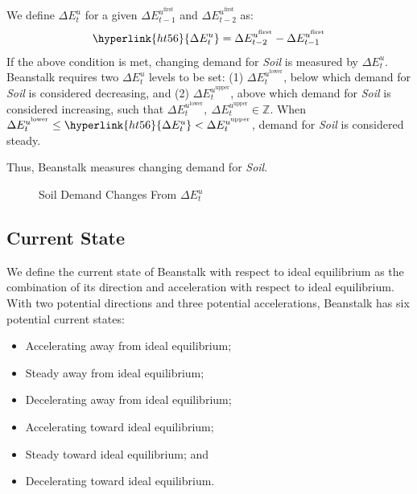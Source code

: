\documentclass[tikz]{article}
\newcommand{\term}[1]{\textsl{#1}}
\begin{document}
We define \hyperlink{ht56}{$\Delta E_{t}^{u}$} for a given $\Delta E_{t-1}^{u^{\text{first}}}$ and $\Delta E_{t-2}^{u^{\text{first}}}$ as:
$$\hyperlink{ht56}{\Delta E_{t}^{u}} = \Delta E_{t-2}^{u^{\text{first}}} - \Delta E_{t-1}^{u^{\text{first}}}$$
If the above condition is met, changing demand for \term{Soil} is measured by \hyperlink{ht56}{$\Delta E_{t}^{u}$}. Beanstalk requires two \hyperlink{ht56}{$\Delta E_{t}^{u}$} levels to be set: (1) $\Delta E_{t}^{u^{\text{lower}}}$, below which demand for \term{Soil} is considered decreasing, and (2) $\Delta E_{t}^{u^{\text{upper}}}$, above which demand for \term{Soil} is considered increasing, such that $\Delta E_{t}^{u^{\text{lower}}},\ \Delta E_{t}^{u^{\text{upper}}} \in \mathbb{Z}$. When $\Delta E_{t}^{u^{\text{lower}}} \leq \hyperlink{ht56}{\Delta E_{t}^{u}} < \Delta E_{t}^{u^{\text{upper}}}$, demand for \term{Soil} is considered steady.

Thus, Beanstalk measures changing demand for \term{Soil}.

\begin{figure}[h!]
    \centering
    
    \vspace*{-10.5mm} %
    \setlength{\belowcaptionskip}{-8pt} %
    \caption{Soil Demand Changes From $\Delta E_{t}^{u}$}
    \label{Fig 9}
\end{figure}

\subsection{Current State}

We define the current state of Beanstalk with respect to ideal equilibrium as the combination of its direction and acceleration with respect to ideal equilibrium. With two potential directions and three potential accelerations, Beanstalk has six potential current states:
\begin{multicols}{2}
\begin{itemize}[midsep]
    \item Accelerating away from ideal equilibrium;
    \item Steady away from ideal equilibrium;
    \item Decelerating away from ideal equilibrium;
    \item Accelerating toward ideal equilibrium;
    \item Steady toward ideal equilibrium; and
    \item Decelerating toward ideal equilibrium.
\end{itemize}
\end{multicols}
\end{document}
